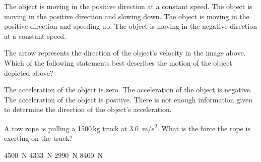 \documentclass[answers]{exam}
\begin{document}
\begin{questions}
\begin{randomizechoices}
    \choice The object is moving in the positive direction at a constant speed.
    \choice The object is moving in the positive direction and slowing down.
    \correctchoice The object is moving in the positive direction and speeding up.
    \choice The object is moving in the negative direction at a constant speed.  
\end{randomizechoices}


\question
\phantom{.}

\begin{center}
\end{center}

The arrow represents the direction of the object's velocity in the image above. Which of the following statements best describes the motion of the object depicted above?

\begin{randomizechoices}
    \choice The acceleration of the object is zero.
    \choice The acceleration of the object is negative.
    \correctchoice The acceleration of the object is positive.
    \choice There is not enough information given to determine the direction of the object’s acceleration.
\end{randomizechoices}


\question
A tow rope is pulling a 1500\,kg truck at \SI{3.0}{m/s^2}. What is the force the rope is exerting on the truck?

\begin{randomizeoneparchoices}
    \correctchoice \SI{4500}{N}
    \choice \SI{4333}{N}
    \choice \SI{2990}{N}
    \choice \SI{8400}{N}
\end{randomizeoneparchoices}



\end{questions}
\end{document}
